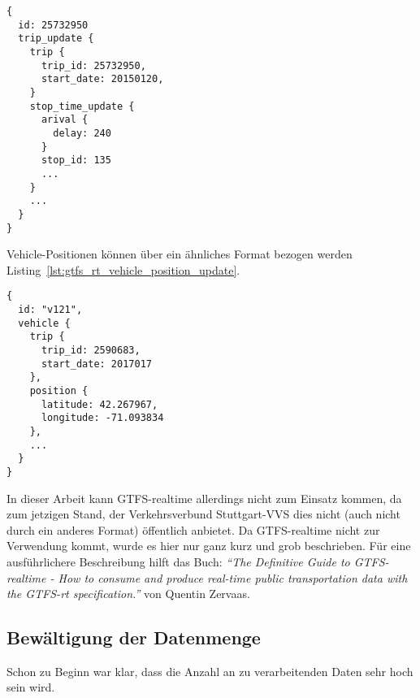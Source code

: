 \begin{newpage}
        \begin{lstlisting}[captionpos=b, caption={Auszug eines GTFS-realtime Trip Updates von MBTA},label={lst:gtfs_rt_trip_update}]
{
  id: 25732950
  trip_update {
    trip {
      trip_id: 25732950,
      start_date: 20150120,
    }
    stop_time_update {
      arival {
        delay: 240
      }
      stop_id: 135
      ...
    }
    ...
  }
}
      \end{lstlisting}

      Vehicle-Positionen können über ein ähnliches Format bezogen werden Listing~\ref{lst:gtfs_rt_vehicle_position_update}.

      \begin{lstlisting}[captionpos={b},caption={Auszug eines GTFS-realtime Vehicle-Position Updates von MBTA},label={lst:gtfs_rt_vehicle_position_update}]
{
  id: "v121",
  vehicle {
    trip {
      trip_id: 2590683,
      start_date: 2017017
    },
    position {
      latitude: 42.267967,
      longitude: -71.093834
    },
    ...
  }
}
      \end{lstlisting}

      In dieser Arbeit kann GTFS-realtime allerdings nicht zum Einsatz kommen, da zum jetzigen Stand, der Verkehrsverbund Stuttgart-VVS dies nicht (auch nicht durch ein anderes Format) öffentlich anbietet. Da GTFS-realtime nicht zur Verwendung kommt, wurde es hier nur ganz kurz und grob beschrieben. Für eine ausführlichere Beschreibung hilft das Buch: \textit{"`The Definitive Guide to GTFS-realtime - How to consume and produce real-time public transportation data with the GTFS-rt specification."'}\parencite{zervaas_realtime} von Quentin Zervaas.\\


    \subsection{Bewältigung der Datenmenge}
    \label{sub:bewältigung_der_datenmenge}
      Schon zu Beginn war klar, dass die Anzahl an zu verarbeitenden Daten sehr hoch sein wird.

        
\end{newpage}